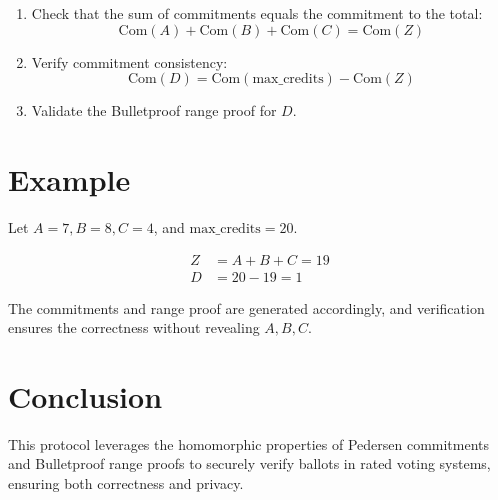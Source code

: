 \documentclass{article}
\begin{document}
\begin{enumerate}
    \item Check that the sum of commitments equals the commitment to the total:
    \[
    \text{Com}(A) + \text{Com}(B) + \text{Com}(C) = \text{Com}(Z)
    \]
    \item Verify commitment consistency:
    \[
    \text{Com}(D) = \text{Com}(\text{max\_credits}) - \text{Com}(Z)
    \]
    \item Validate the Bulletproof range proof for \( D \).
\end{enumerate}

\section{Example}
Let \( A = 7, B = 8, C = 4 \), and \( \text{max\_credits} = 20 \).

\begin{align*}
Z &= A + B + C = 19 \\
D &= 20 - 19 = 1
\end{align*}

The commitments and range proof are generated accordingly, and verification ensures the correctness without revealing \( A, B, C \).

\section{Conclusion}
This protocol leverages the homomorphic properties of Pedersen commitments and Bulletproof range proofs to securely verify ballots in rated voting systems, ensuring both correctness and privacy.
\end{document}
